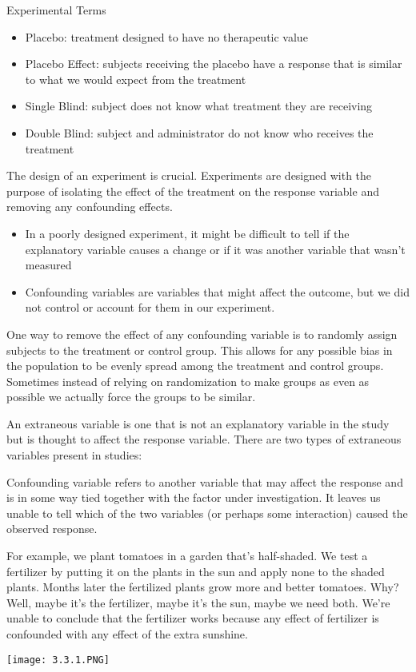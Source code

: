 \documentclass[../stats.tex]{subfiles}
\begin{document}
Experimental Terms 
\begin{itemize}
    \item Placebo: treatment designed to have no therapeutic value 
    \item Placebo Effect: subjects receiving the placebo have a response that is similar to what we would expect from the treatment 
    \item Single Blind: subject does not know what treatment they are receiving 
    \item Double Blind: subject and administrator do not know who receives the treatment 
\end{itemize}

The design of an experiment is crucial. Experiments are designed with the purpose of isolating the effect of the treatment on the response variable and removing any confounding effects.
\begin{itemize}
    \item In a poorly designed experiment, it might be difficult to tell if the explanatory variable causes a change or if it was another variable that wasn't measured 
    \item Confounding variables are variables that might affect the outcome, but we did not control or account for them in our experiment.
\end{itemize}

One way to remove the effect of any confounding variable is to randomly assign subjects to the treatment or control group. This allows for any possible bias in the population to be evenly spread among the treatment and control groups.
Sometimes instead of relying on randomization to make groups as even as possible we actually force the groups to be similar.

An extraneous variable is one that is not an explanatory variable in the study but is thought to affect the response variable. There are two types of extraneous variables present in studies:

Confounding variable refers to another variable that may affect the response and is in some way tied together with the factor under investigation. It leaves us unable to tell which of the two variables (or perhaps some interaction) caused the observed response.

For example, we plant tomatoes in a garden that's half-shaded. We test a fertilizer by putting it on the plants in the sun and apply none to the shaded plants. Months later the fertilized plants grow more and better tomatoes. Why? 
Well, maybe it's the fertilizer, maybe it's the sun, maybe we need both. We're unable to conclude that the fertilizer works because any effect of fertilizer is confounded with any effect of the extra sunshine.
\begin{center}
    \texttt{[image: 3.3.1.PNG]}
\end{center}
\end{document}
